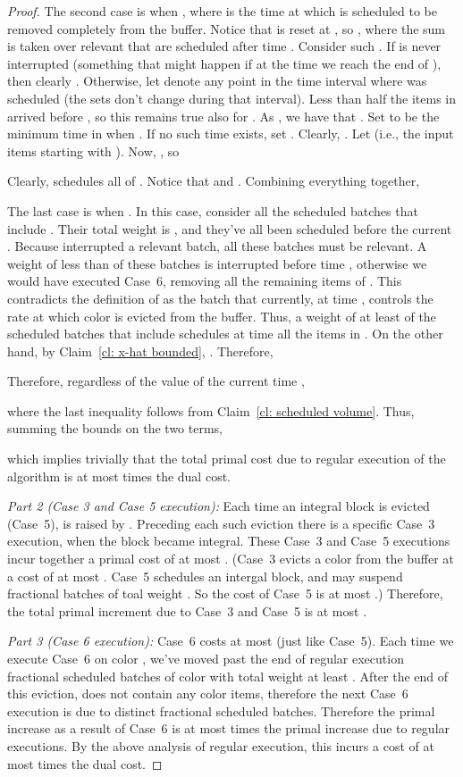 \documentclass[12pt]{article}
\begin{document}
\begin{proof}
The second case is when ,
where  is the time at which 
is scheduled to be removed completely from the buffer.
Notice that  is reset at , 
so , where the sum is taken
over relevant  that are scheduled after time .
Consider such . 
If  is never interrupted (something that
might happen if  at the time we reach
the end of ), then clearly .
Otherwise, let  denote any point in the time
interval where  was scheduled (the sets don't change during that
interval). Less than half the items in  arrived 
before , so this remains true also for . 
As , we have that .
Set  to be the minimum time in  when
. If no such time exists, set
. Clearly, .
Let  (i.e., the input items starting
with ). Now, ,
so 

Clearly,  schedules all of . 
Notice that 
 and
.
Combining everything together,


The last case is when . In this
case, consider all the scheduled batches that include .
Their total weight is , and they've all been scheduled
before the current . Because  interrupted a
relevant batch, all these batches must be relevant. A weight
of less than  of these batches is interrupted
before time , otherwise we would have executed
Case~6, removing all the remaining items of . This 
contradicts the definition of  as the batch that 
currently, at time , controls the rate at which color
 is evicted from the buffer. Thus, a weight of at least 
of the scheduled batches that include  schedules at time 
 all the items in . On the other 
hand, by Claim~\ref{cl: x-hat bounded}, 
. Therefore,

Therefore, regardless of the value of the current time ,

where the last inequality follows from Claim~\ref{cl: scheduled volume}.
Thus, summing the bounds on the two terms,

which implies trivially that the total primal cost due to 
regular execution of the algorithm is at most  times 
the dual cost.

{\em Part 2 (Case 3 and Case 5 execution):}\/
Each time an integral block is evicted (Case~5),
 is raised by .
Preceding each such eviction there is a specific Case~3 execution, 
 when the block became integral. 
These Case~3 and Case~5 executions incur together
a primal cost of at most . (Case~3 evicts a color from
the buffer at a cost of at most . Case~5 schedules an
intergal block, and may suspend fractional batches of
toal weight . So the cost of Case~5 is at most .)
Therefore, the total primal increment due
to Case~3 and Case~5 is at most .

{\em Part 3 (Case 6 execution):}\/ Case~6 costs at most  (just like
Case~5). Each time we execute Case~6 on color , we've moved past
the end of regular execution fractional scheduled batches of color  with
total weight at least . After the end of this eviction,
 does not contain any color  items, therefore the next Case~6
execution is due to distinct fractional scheduled batches.
Therefore the primal increase as a result of Case~6 is at most
 times the primal increase due to regular executions.
By the above analysis of regular execution, this incurs a cost of 
at most  times the dual cost.
\end{proof}
\end{document}

